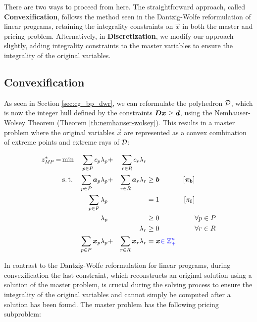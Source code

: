There are two ways to proceed from here. The straightforward approach, called \textbf{Convexification}, follows the method seen in the Dantzig-Wolfe reformulation of linear programs, retaining the integrality constraints on $\vec{x}$ in both the master and pricing problem. Alternatively, in \textbf{Discretization}, we modify our approach slightly, adding integrality constraints to the master variables to ensure the integrality of the original variables.

\subsection{Convexification}\label{sec:cg_bp_ip_convexification}
As seen in Section \ref{sec:cg_bp_dwr}, we can reformulate the polyhedron $\mathcal{D}$, which is now the integer hull defined by the constraints ${\bm{D}} {\bm{x}} \geq {\bm{d}}$, using the Nemhauser-Wolsey Theorem (Theorem \ref{th:nemhauser-wolsey}). This results in a master problem where the original variables $\vec{x}$ are represented as a convex combination of extreme points and extreme rays of $\mathcal{D}$:

\begin{equation}
\begin{aligned}
z^*_{\textit{MP}}{} = &\min & \sum_{p \in P} c_p \lambda_p &+ &\sum_{r \in R} c_r \lambda_r & & & \\
&\operatorname{s.t.} & \sum_{p \in P} {\bm{a}}_p \lambda_p &+ &\sum_{r \in R} {\bm{a}}_r \lambda_r & \geq {\bm{b}} & \left[{\bm{\pi}}_{\bm{b}}\right] \\
&& \sum_{p \in P} \lambda_p & & & = 1 & \left[\pi_0 \right] & \\
&& \lambda_p & & & \geq 0 & & \forall p \in P \\
&& & & \lambda_r & \geq 0 & & \forall r \in R \\
&& \sum_{p \in P} {\bm{x}}_p \lambda_p &+ &\sum_{r \in R} {\bm{x}}_r \lambda_r & = {\bm{x}} {\color{blue} \in \mathbb{Z}_+^n} & &
\end{aligned}
\end{equation}


In contrast to the Dantzig-Wolfe reformulation for linear programs, during convexification the last constraint, which reconstructs an original solution using a solution of the master problem, is crucial during the solving process to ensure the integrality of the original variables and cannot simply be computed after a solution has been found. The master problem has the following pricing subproblem:

